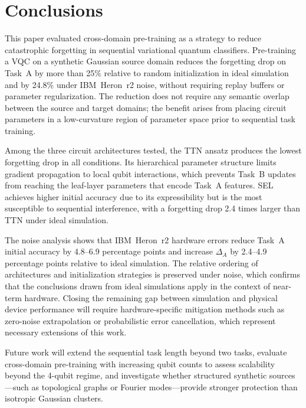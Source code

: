 \documentclass[10pt,conference]{IEEEtran}
\begin{document}
\section{Conclusions}

This paper evaluated cross-domain pre-training as a strategy to reduce
catastrophic forgetting in sequential variational quantum classifiers.
Pre-training a VQC on a synthetic Gaussian source domain reduces the
forgetting drop on Task~A by more than 25\% relative to random
initialization in ideal simulation and by 24.8\% under IBM~Heron~r2
noise, without requiring replay buffers or parameter regularization.
The reduction does not require any semantic overlap between the source
and target domains; the benefit arises from placing circuit parameters
in a low-curvature region of parameter space prior to sequential task
training.

Among the three circuit architectures tested, the TTN ansatz produces
the lowest forgetting drop in all conditions. Its hierarchical parameter
structure limits gradient propagation to local qubit interactions,
which prevents Task~B updates from reaching the leaf-layer parameters
that encode Task~A features. SEL achieves higher initial accuracy due
to its expressibility but is the most susceptible to sequential
interference, with a forgetting drop 2.4 times larger than TTN under
ideal simulation.

The noise analysis shows that IBM~Heron~r2 hardware errors reduce
Task~A initial accuracy by 4.8--6.9 percentage points and increase
$\Delta_A$ by 2.4--4.9 percentage points relative to ideal simulation.
The relative ordering of architectures and initialization strategies
is preserved under noise, which confirms that the conclusions drawn from
ideal simulations apply in the context of near-term hardware. Closing the
remaining gap between simulation and physical device performance will
require hardware-specific mitigation methods such as zero-noise
extrapolation or probabilistic error cancellation, which represent
necessary extensions of this work.

Future work will extend the sequential task length beyond two tasks,
evaluate cross-domain pre-training with increasing qubit counts to
assess scalability beyond the 4-qubit regime, and investigate whether
structured synthetic sources---such as topological graphs or Fourier
modes---provide stronger protection than isotropic Gaussian clusters.



\end{document}
